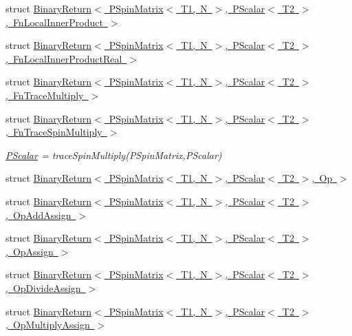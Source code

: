 \begin{DoxyCompactItemize}
\item 
struct \mbox{\hyperlink{structENSEM_1_1BinaryReturn_3_01PSpinMatrix_3_01T1_00_01N_01_4_00_01PScalar_3_01T2_01_4_00_01FnLocalInnerProduct_01_4}{Binary\+Return$<$ P\+Spin\+Matrix$<$ T1, N $>$, P\+Scalar$<$ T2 $>$, Fn\+Local\+Inner\+Product $>$}}
\item 
struct \mbox{\hyperlink{structENSEM_1_1BinaryReturn_3_01PSpinMatrix_3_01T1_00_01N_01_4_00_01PScalar_3_01T2_01_4_00_01FnLocalInnerProductReal_01_4}{Binary\+Return$<$ P\+Spin\+Matrix$<$ T1, N $>$, P\+Scalar$<$ T2 $>$, Fn\+Local\+Inner\+Product\+Real $>$}}
\item 
struct \mbox{\hyperlink{structENSEM_1_1BinaryReturn_3_01PSpinMatrix_3_01T1_00_01N_01_4_00_01PScalar_3_01T2_01_4_00_01FnTraceMultiply_01_4}{Binary\+Return$<$ P\+Spin\+Matrix$<$ T1, N $>$, P\+Scalar$<$ T2 $>$, Fn\+Trace\+Multiply $>$}}
\item 
struct \mbox{\hyperlink{structENSEM_1_1BinaryReturn_3_01PSpinMatrix_3_01T1_00_01N_01_4_00_01PScalar_3_01T2_01_4_00_01FnTraceSpinMultiply_01_4}{Binary\+Return$<$ P\+Spin\+Matrix$<$ T1, N $>$, P\+Scalar$<$ T2 $>$, Fn\+Trace\+Spin\+Multiply $>$}}
\begin{DoxyCompactList}\small\item\em \mbox{\hyperlink{classENSEM_1_1PScalar}{P\+Scalar}} = trace\+Spin\+Multiply(\+P\+Spin\+Matrix,\+P\+Scalar) \end{DoxyCompactList}\item 
struct \mbox{\hyperlink{structENSEM_1_1BinaryReturn_3_01PSpinMatrix_3_01T1_00_01N_01_4_00_01PScalar_3_01T2_01_4_00_01Op_01_4}{Binary\+Return$<$ P\+Spin\+Matrix$<$ T1, N $>$, P\+Scalar$<$ T2 $>$, Op $>$}}
\item 
struct \mbox{\hyperlink{structENSEM_1_1BinaryReturn_3_01PSpinMatrix_3_01T1_00_01N_01_4_00_01PScalar_3_01T2_01_4_00_01OpAddAssign_01_4}{Binary\+Return$<$ P\+Spin\+Matrix$<$ T1, N $>$, P\+Scalar$<$ T2 $>$, Op\+Add\+Assign $>$}}
\item 
struct \mbox{\hyperlink{structENSEM_1_1BinaryReturn_3_01PSpinMatrix_3_01T1_00_01N_01_4_00_01PScalar_3_01T2_01_4_00_01OpAssign_01_4}{Binary\+Return$<$ P\+Spin\+Matrix$<$ T1, N $>$, P\+Scalar$<$ T2 $>$, Op\+Assign $>$}}
\item 
struct \mbox{\hyperlink{structENSEM_1_1BinaryReturn_3_01PSpinMatrix_3_01T1_00_01N_01_4_00_01PScalar_3_01T2_01_4_00_01OpDivideAssign_01_4}{Binary\+Return$<$ P\+Spin\+Matrix$<$ T1, N $>$, P\+Scalar$<$ T2 $>$, Op\+Divide\+Assign $>$}}
\item 
struct \mbox{\hyperlink{structENSEM_1_1BinaryReturn_3_01PSpinMatrix_3_01T1_00_01N_01_4_00_01PScalar_3_01T2_01_4_00_01OpMultiplyAssign_01_4}{Binary\+Return$<$ P\+Spin\+Matrix$<$ T1, N $>$, P\+Scalar$<$ T2 $>$, Op\+Multiply\+Assign $>$}}

\end{DoxyCompactItemize}
